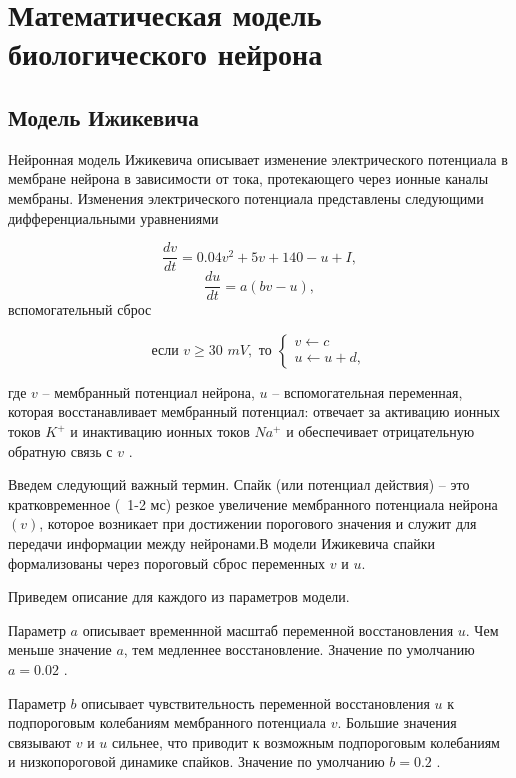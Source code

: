 \chapter{Математическая модель биологического нейрона}
\label{ch:chap2}

\section{Модель Ижикевича}
Нейронная модель Ижикевича описывает изменение электрического потенциала в мембране нейрона в зависимости от тока, протекающего через ионные каналы мембраны. Изменения электрического потенциала представлены следующими дифференциальными уравнениями

\begin{equation}
    \frac{dv}{dt} = 0.04v^2+5v+140-u+I,
\end{equation}
\begin{equation}
    \frac{du}{dt} = a(bv-u),
\end{equation}
вспомогательный сброс

\begin{equation}
    \text{если } v \geq 30 \, \, mV , \text{ то } \begin{cases}
        v \leftarrow c\\
        u \leftarrow u+d,
    \end{cases}
\end{equation}

где $v$ -- мембранный потенциал нейрона, $u$ -- вспомогательная переменная, которая восстанавливает мембранный потенциал: отвечает за активацию ионных токов $K^+$ и инактивацию ионных токов $Na^+$ и обеспечивает отрицательную обратную связь с $v$ \cite{dhamo2021efficient}.

Введем следующий важный термин. Спайк (или потенциал действия) -- это кратковременное (~1-2 мс) резкое увеличение мембранного потенциала нейрона $(v)$, которое возникает при достижении порогового значения и служит для передачи информации между нейронами.В модели Ижикевича спайки формализованы через пороговый сброс переменных $v$ и $u$. 


Приведем описание для каждого из параметров модели.


Параметр $a$ описывает временнной масштаб переменной восстановления $u$. Чем меньше значение $a$, тем медленнее восстановление. Значение по умолчанию  $a=0.02$ \cite{dhamo2021efficient}.

Параметр $b$ описывает чувствительность переменной восстановления $u$ к подпороговым колебаниям мембранного потенциала $v$. Большие значения связывают $v$ и $u$ сильнее, что приводит к возможным подпороговым колебаниям и низкопороговой динамике спайков. Значение по умолчанию $b = 0.2$ \cite{dhamo2021efficient}.

